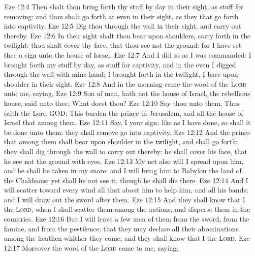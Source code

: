 \vs Eze 12:4 Then shalt thou bring forth thy stuff by day in their sight, as stuff for removing: and thou shalt go forth at even in their sight, as they that go forth into captivity.
\vs Eze 12:5 Dig thou through the wall in their sight, and carry out thereby.
\vs Eze 12:6 In their sight shalt thou bear  upon  shoulders,  carry  forth in the twilight: thou shalt cover thy face, that thou see not the ground: for I have set thee  a sign unto the house of Israel.
\vs Eze 12:7 And I did so as I was commanded: I brought forth my stuff by day, as stuff for captivity, and in the even I digged through the wall with mine hand; I brought  forth in the twilight,  I bare  upon  shoulder in their sight.
\vs Eze 12:8 And in the morning came the word of the \textsc{Lord} unto me, saying,
\vs Eze 12:9 Son of man, hath not the house of Israel, the rebellious house, said unto thee, What doest thou?
\vs Eze 12:10 Say thou unto them, Thus saith the Lord GOD; This burden  the prince in Jerusalem, and all the house of Israel that  among them.
\vs Eze 12:11 Say, I  your sign: like as I have done, so shall it be done unto them: they shall remove  go into captivity.
\vs Eze 12:12 And the prince that  among them shall bear upon  shoulder in the twilight, and shall go forth: they shall dig through the wall to carry out thereby: he shall cover his face, that he see not the ground with  eyes.
\vs Eze 12:13 My net also will I spread upon him, and he shall be taken in my snare: and I will bring him to Babylon  the land of the Chaldeans; yet shall he not see it, though he shall die there.
\vs Eze 12:14 And I will scatter toward every wind all that  about him to help him, and all his bands; and I will draw out the sword after them.
\vs Eze 12:15 And they shall know that I  the \textsc{Lord}, when I shall scatter them among the nations, and disperse them in the countries.
\vs Eze 12:16 But I will leave a few men of them from the sword, from the famine, and from the pestilence; that they may declare all their abominations among the heathen whither they come; and they shall know that I  the \textsc{Lord}.
\vs Eze 12:17 Moreover the word of the \textsc{Lord} came to me, saying,
